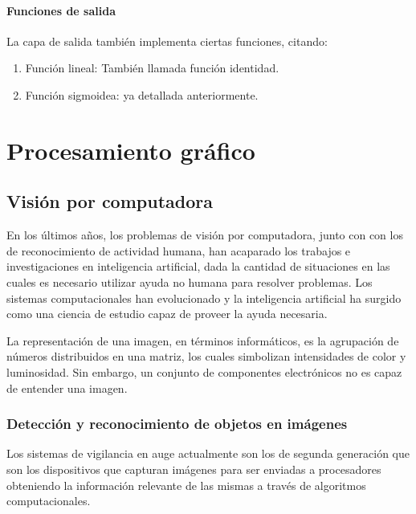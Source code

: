 \documentclass[a4paper,12pt,oneside,spanish]{book}
\begin{document}
\subsubsection{Funciones de salida}
La capa de salida también implementa ciertas funciones, citando:\par

\begin{enumerate}[noitemsep]
	\item Función lineal: También llamada función identidad. 
	\item Función sigmoidea: ya detallada anteriormente. 
\end{enumerate}

\newpage
\chapter{Procesamiento gráfico}
\section{Visión por computadora}\label{visionporcomputadora}

En los últimos años, los problemas de visión por computadora, junto con con los de reconocimiento de actividad humana, han acaparado los trabajos e investigaciones en inteligencia artificial, dada la cantidad de situaciones en las cuales es necesario utilizar ayuda no humana para resolver problemas. Los sistemas computacionales han evolucionado y la inteligencia artificial ha surgido como una ciencia de estudio capaz de proveer la ayuda necesaria. \par

La representación de una imagen, en términos informáticos, es la agrupación de números distribuidos en una matriz, los cuales simbolizan intensidades de color y luminosidad. Sin embargo, un conjunto de componentes electrónicos no es capaz de entender una imagen.\par

\subsection{Detección y reconocimiento de objetos en imágenes}

Los sistemas de vigilancia en auge actualmente son los de segunda generación que son los dispositivos que capturan imágenes para ser  enviadas a procesadores obteniendo la información relevante de las mismas a través de algoritmos computacionales. \par
\end{document}
